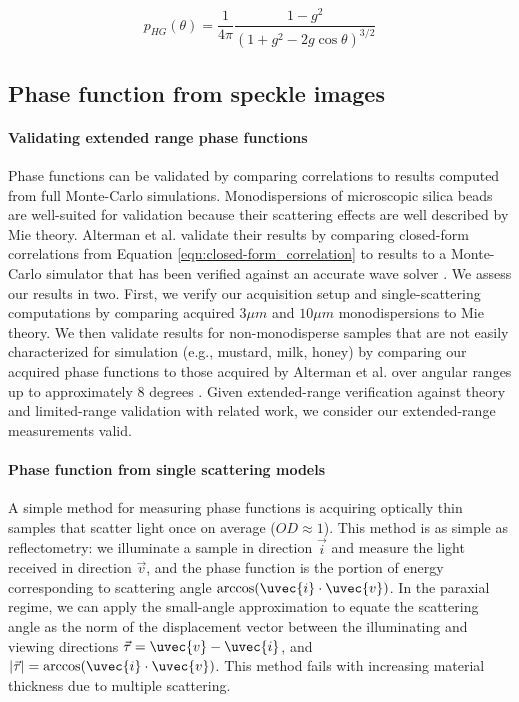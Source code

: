 \begin{equation}
    p_{HG}(\theta) = \frac{1}{4\pi} \frac{1 - g^2}{(1 + g^2 - 2 g \cos{\theta})^{3/2}}
\end{equation}

\subsection{Phase function from speckle images}

\paragraph{Validating extended range phase functions}
Phase functions can be validated by comparing correlations to results computed from full Monte-Carlo simulations. Monodispersions of microscopic silica beads are well-suited for validation because their scattering effects are well described by Mie theory. Alterman et al. validate their results by comparing closed-form correlations from Equation \ref{eqn:closed-form_correlation} to results to a Monte-Carlo simulator \cite{bar2019monte} that has been verified against an accurate wave solver \cite{thierry2015mu}. We assess our results in two. First, we verify our acquisition setup and single-scattering computations by comparing acquired $3\mu m$ and $10\mu m$ monodispersions to Mie theory. We then validate results for non-monodisperse samples that are not easily characterized for simulation (e.g., mustard, milk, honey) by comparing our acquired phase functions to those acquired by Alterman et al. over angular ranges up to approximately 8 degrees \cite{alterman2022direct}. Given extended-range verification against theory and limited-range validation with related work, we consider our extended-range measurements valid.

\paragraph{Phase function from single scattering models}
A simple method for measuring phase functions is acquiring optically thin samples that scatter light once on average ($OD \approx 1$). This method is as simple as reflectometry: we illuminate a sample in direction $\vec{i}$ and measure the light received in direction $\vec{v}$, and the phase function is the portion of energy corresponding to scattering angle $\arccos(\uvec{i} \cdot \uvec{v})$. In the paraxial regime, we can apply the small-angle approximation to equate the scattering angle as the norm of the displacement vector between the illuminating and viewing directions $\vec{\tau} = \uvec{v} - \uvec{i}$, and $ |\vec{\tau}| = \arccos(\uvec{i} \cdot \uvec{v})$. This method fails with increasing material thickness due to multiple scattering.
